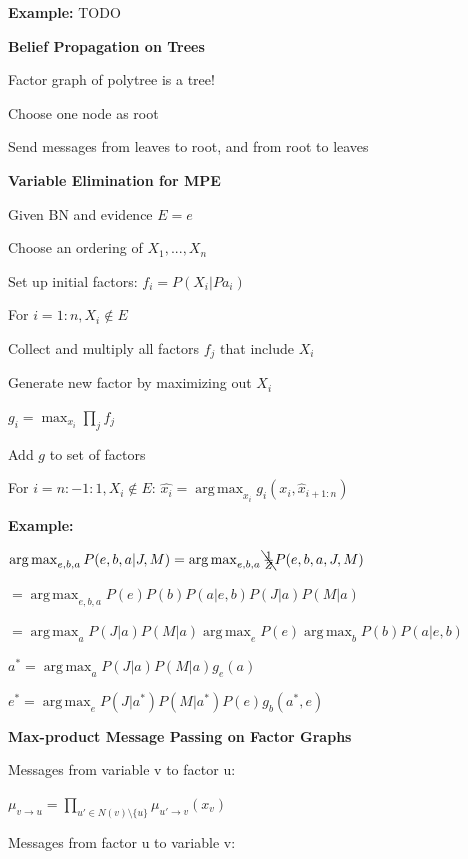 \documentclass[a4paper, 11pt]{scrartcl}
\DeclareMathOperator*{\argmax}{arg\,max}
\begin{document}
\begin{multicols*}{3}
	\textbf{Example:} TODO

	\textbf{Belief Propagation on Trees}
	\begin{compactitem}
		\item Factor graph of polytree is a tree!
		\item Choose one node as root
		\item Send messages from leaves to root, and from root to leaves
	\end{compactitem}
   
\textbf{Variable Elimination for MPE}	
	\begin{compactitem}
	\item Given BN and evidence $E=e$
	\item Choose an ordering of $X_1, ...,X_n$
	\item Set up initial factors: $f_i = P(X_i | Pa_i)$
	\item For $i=1:n, X_i \notin  E$
  	\begin{compactenum}
  	\item Collect and multiply all factors $f_j$ that include $X_i$   
  	\item Generate new factor by maximizing out $X_i$
  	
	$g_i = \max_{x_i} \prod_{j} f_j$
  	\item Add $g$ to set of factors
  	\end{compactenum}
	\item For $i=n:-1:1, X_i \notin  E$:  $\hat{x_i} = \argmax_{x_i} g_i(x_i, \hat{x}_{i+1:n})$
\end{compactitem}

\textbf{Example: }

$\argmax_{e , b, a} P(e,b,a| J, M) = \argmax_{e , b, a} \bcancel{\frac{1}{Z}} P(e,b,a, J,M)$

$= \argmax_{e , b, a} P(e)P(b)P(a|e,b)P(J|a)P(M|a)$

$= \argmax_{a} P(J|a)P(M|a)  \argmax_{e} P(e)  \argmax_{b} P(b)P(a|e,b)$

$a^{*} = \argmax_{a} P(J|a)P(M|a) g_e(a)$

$e^{*} = \argmax_{e} P(J|a^*)P(M|a^*) P(e) g_b(a^*,e)$


\textbf{Max-product Message Passing on Factor Graphs}

Messages from variable v to factor u: 

$\mu_{v \rightarrow u} = \prod_{u' \in N(v) \setminus \{u\}} \mu_{u' \rightarrow v}(x_{v})$ 

Messages from factor u to variable v:


\end{multicols*}
\end{document}
